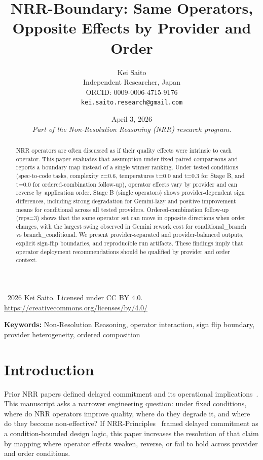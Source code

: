 \documentclass[11pt,a4paper]{article}
\title{\textbf{NRR-Boundary: Same Operators, Opposite Effects by Provider and Order}}
\author{
  Kei Saito \\
  Independent Researcher, Japan \\
  ORCID: 0009-0006-4715-9176 \\
  \texttt{kei.saito.research@gmail.com}
}
\date{April 3, 2026 \\[0.5em]
\textit{Part of the Non-Resolution Reasoning (NRR) research program.}}
\begin{document}
\maketitle

\begin{center}
\textcopyright\ 2026 Kei Saito.
Licensed under CC BY 4.0.\\
\url{https://creativecommons.org/licenses/by/4.0/}
\end{center}

\begin{abstract}
NRR operators are often discussed as if their quality effects were intrinsic to each operator. This paper evaluates that assumption under fixed paired comparisons and reports a boundary map instead of a single winner ranking. Under tested conditions (spec-to-code tasks, complexity c=0.6, temperatures t=0.0 and t=0.3 for Stage B, and t=0.0 for ordered-combination follow-up), operator effects vary by provider and can reverse by application order. Stage B (single operators) shows provider-dependent sign differences, including strong degradation for Gemini-lazy and positive improvement means for conditional across all tested providers. Ordered-combination follow-up (reps=3) shows that the same operator set can move in opposite directions when order changes, with the largest swing observed in Gemini rework cost for conditional\_branch vs branch\_conditional. We present provider-separated and provider-balanced outputs, explicit sign-flip boundaries, and reproducible run artifacts. These findings imply that operator deployment recommendations should be qualified by provider and order context.
\end{abstract}

\noindent\textbf{Keywords:} Non-Resolution Reasoning, operator interaction, sign flip boundary, provider heterogeneity, ordered composition

\section{Introduction}
\label{sec:intro}

Prior NRR papers defined delayed commitment and its operational implications~\cite{saito2025nrr,saito2026phi,saito2026ime,saito2026principles}. This manuscript asks a narrower engineering question: under fixed conditions, where do NRR operators improve quality, where do they degrade it, and where do they become non-effective?
If NRR-Principles~\cite{saito2026principles} framed delayed commitment as a condition-bounded design logic, this paper increases the resolution of that claim by mapping where operator effects weaken, reverse, or fail to hold across provider and order conditions.
\end{document}
